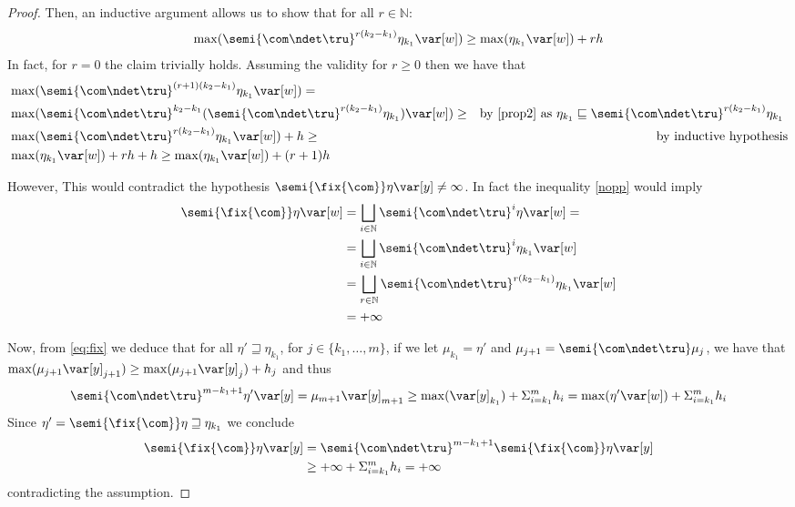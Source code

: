 \begin{proof}
  \noindent    
  Then, an inductive argument allows us to show that for all \(r \in \mathbb{N}\):
  \begin{equation}\label{nopp}
    \max(\semi{\com \ndet \tru}^{r(k_2-k_1)} \eta_{k_1} \var[w]) \geq \max(\eta_{k_1}
    \var[w]) + r h
  \end{equation}  
  In fact, for \(r=0\) the claim trivially holds. Assuming the
  validity for \(r\geq 0\) then we have that
  \begin{align*}    
    & \max(\semi{\com \ndet \tru}^{(r+1)(k_2-k_1)} \eta_{k_1} \var[w]) =\\
    &\max(\semi{\com \ndet \tru}^{k_2-k_1} ( \semi{\com \ndet \tru}^{r(k_2-k_1)} \eta_{k_1}) \var[w]) \geq & \mbox{by \eqref{prop2} as \(\eta_{k_1} \sqsubseteq \semi{\com \ndet \tru}^{r(k_2-k_1)} \eta_{k_1}\) }\\
    &\max(\semi{\com \ndet \tru}^{r(k_2-k_1)} \eta_{k_1} \var[w]) + h \geq & \mbox{by inductive hypothesis}\\
    &  \max(\eta_{k_1}\var[w])  + rh + h
      \geq 
      \max(\eta_{k_1}\var[w])  + (r+1)h
  \end{align*}

  \noindent
  However, This would contradict the hypothesis
  \(\semi{\fix{\com}} \eta \var[y] \neq \infty\). In fact the
  inequality \eqref{nopp} would imply
  \begin{align*}
    \semi{\fix{\com}} \eta \var[w]
    & = \bigsqcup_{i \in \mathbb{N}} \semi{\com
      \ndet \tru}^i \eta \var[w] =\\ 
    & =  \bigsqcup_{i \in \mathbb{N}} \semi{\com \ndet
      \tru}^i \eta_{k_1} \var[w]\\ 
    & = \bigsqcup_{r \in \mathbb{N}} \semi{\com \ndet
      \tru}^{r(k_2-k_1)} \eta_{k_1} \var[w]\\
    & = +\infty
  \end{align*}

  Now, from \eqref{eq:fix} we deduce that for all
  \(\eta' \sqsupseteq \eta_{k_1}\), for \(j \in \{ k_1, \ldots, m\}\),
  if we let \(\mu_{k_1} = \eta'\) and
  \(\mu_{j+1} = \semi{\com \ndet \tru} \mu_j\), we have that
  \(\max(\mu_{j+1} \var[y]_{j+1}) \geq \max(\mu_{j+1} \var[y]_{j}) +
  h_j\) and thus
  \[
  \semi{\com \ndet \tru}^{m-k_1+1} \eta' \var[y] = \mu_{m+1}
  \var[y]_{m+1} \geq 
  \max(\var[y]_{k_1}) + \Sigma_{i=k_1}^m h_i = \max(\eta' \var[w]) + \Sigma_{i=k_1}^m h_i
  \]
  Since \(\eta' = \semi{\fix{\com}} \eta \sqsupseteq \eta_{k_1}\) we conclude
  \begin{align*}
    \semi{\fix{\com}} \eta \var[y]
    & = \semi{\com \ndet \tru}^{m-k_1+1} \semi{\fix{\com}} \eta \var[y]\\
    & \geq +\infty + \Sigma_{i=k_1}^m h_i = +\infty
  \end{align*}
  contradicting the assumption.
  

\end{proof}
